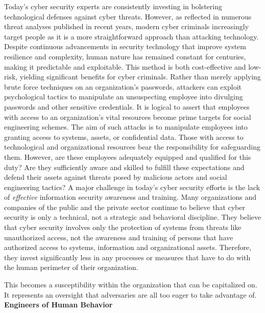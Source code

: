 Today's cyber security experts are consistently investing in bolstering technological defenses against cyber threats. However, as reflected in numerous threat analyses published in recent years, modern cyber criminals increasingly target people as it is a more straightforward approach than attacking technology. Despite continuous advancements in security technology that improve system resilience and complexity, human nature has remained constant for centuries, making it predictable and exploitable. This method is both cost-effective and low-risk, yielding significant benefits for cyber criminals. Rather than merely applying brute force techniques on an organization's passwords, attackers can exploit psychological tactics to manipulate an unsuspecting employee into divulging passwords and other sensitive credentials.
It is logical to assert that employees with access to an organization's vital resources become prime targets for social engineering schemes. The aim of such attacks is to manipulate employees into granting access to systems, assets, or confidential data. Those with access to technological and organizational resources bear the responsibility for safeguarding them. However, are these employees adequately equipped and qualified for this duty? Are they sufficiently aware and skilled to fulfill these expectations and defend their assets against threats posed by malicious actors and social engineering tactics?
A major challenge in today's cyber security efforts is the lack of \textit{effective }information security awareness and training. Many organizations and companies of the public and the private sector continue to believe that cyber security is only a technical, not a strategic and behavioral discipline. They believe that cyber security involves only the protection of systems from threats like unauthorized access, not the awareness and training of persons that have authorized access to systems, information and organizational assets. Therefore, they invest significantly less in any processes or measures that have to do with the human perimeter of their organization.

This becomes a susceptibility within the organization that can be capitalized on. It represents an oversight that adversaries are all too eager to take advantage of.
\textbf{Engineers of Human Behavior}

